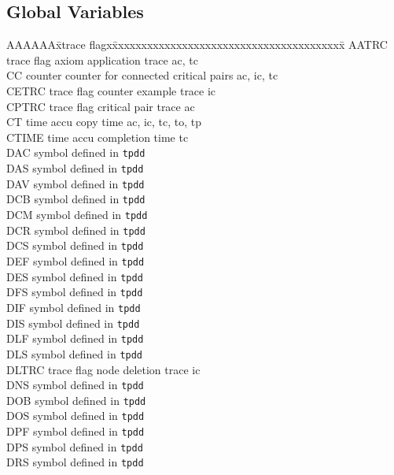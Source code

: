 \subsection{Global Variables}
\label{Ap:gv}
\begin{tabbing}
AAAAAA\=xtrace flagx\=xxxxxxxxxxxxxxxxxxxxxxxxxxxxxxxxxxxxxxxx\= \kill
AATRC \> trace flag \> axiom application trace \> ac, tc \\
CC    \> counter    \> counter for connected critical pairs \> ac, ic, tc \\
CETRC \> trace flag \> counter example trace  \> ic \\
CPTRC \> trace flag \> critical pair trace \> ac \\
CT    \> time accu  \> copy time \> ac, ic, tc, to, tp \\
CTIME \> time accu  \> completion time \> tc \\
DAC   \> symbol defined in {\tt tpdd} \\
DAS   \> symbol defined in {\tt tpdd} \\
DAV   \> symbol defined in {\tt tpdd} \\
DCB   \> symbol defined in {\tt tpdd} \\
DCM   \> symbol defined in {\tt tpdd} \\
DCR   \> symbol defined in {\tt tpdd} \\
DCS   \> symbol defined in {\tt tpdd} \\
DEF   \> symbol defined in {\tt tpdd} \\
DES   \> symbol defined in {\tt tpdd} \\
DFS   \> symbol defined in {\tt tpdd} \\
DIF   \> symbol defined in {\tt tpdd} \\
DIS   \> symbol defined in {\tt tpdd} \\
DLF   \> symbol defined in {\tt tpdd} \\
DLS   \> symbol defined in {\tt tpdd} \\
DLTRC \> trace flag \> node deletion trace \> ic \\
DNS   \> symbol defined in {\tt tpdd} \\
DOB   \> symbol defined in {\tt tpdd} \\
DOS   \> symbol defined in {\tt tpdd} \\
DPF   \> symbol defined in {\tt tpdd} \\
DPS   \> symbol defined in {\tt tpdd} \\
DRS   \> symbol defined in {\tt tpdd} \\

\end{tabbing}
